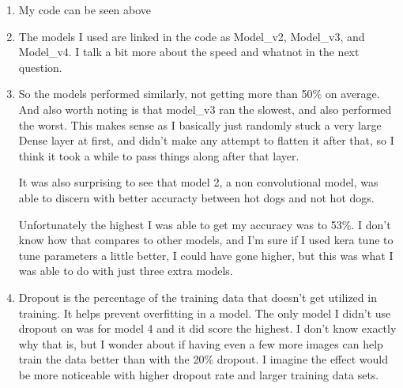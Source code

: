 \documentclass[
]{article}
\begin{document}
\begin{enumerate}
    \item My code can be seen above

    \item The models I used are linked in the code as Model\_v2, Model\_v3, and
        Model\_v4. I talk a bit more about the speed and whatnot in the next
        question.

    \item So the models performed similarly, not getting more than 50\% on
        average. And also worth noting is that model\_v3 ran the slowest, and
        also performed the worst. This makes sense as I basically just randomly
        stuck a very large Dense layer at first, and didn't make any attempt to
        flatten it after that, so I think it took a while to pass things along
        after that layer. 

        It was also surprising to see that model 2, a non convolutional model,
        was able to discern with better accuracty between hot dogs and not hot
        dogs.
        
        Unfortunately the highest I was able to get my accuracy was to 53\%. I
        don't know how that compares to other models, and I'm sure if I used
        kera tune to tune parameters a little better, I could have gone higher,
        but this was what I was able to do with just three extra models.

    \item Dropout is the percentage of the training data that doesn't get
        utilized in training. It helps prevent overfitting in a model. The only
        model I didn't use dropout on was for model 4 and it did score the
        highest. I don't know exactly why that is, but I wonder about if having
        even a few more images can help train the data better than with the
        20\% dropout. I imagine the effect would be more noticeable with higher
        dropout rate and larger training data sets.
\end{enumerate}
\end{document}

